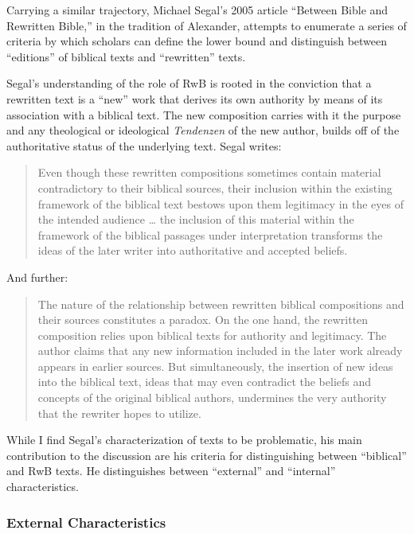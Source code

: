 Carrying a similar trajectory, Michael Segal's 2005 article ``Between Bible and Rewritten Bible,'' in the tradition of Alexander, attempts to enumerate a series of criteria by which scholars can define the lower bound and distinguish between ``editions'' of biblical texts and ``rewritten'' texts. 

Segal's understanding of the role of RwB is rooted in the conviction that a rewritten text is a ``new'' work that derives its own authority by means of its association with a biblical text. The new composition carries with it the purpose and any theological or ideological \emph{Tendenzen} of the new author, builds off of the authoritative status of the underlying text.%
    \autocite[11]{segal_henze2005} Segal writes: 

\begin{quote}
    Even though these rewritten compositions sometimes contain material contradictory to their biblical sources, their inclusion within the existing framework of the biblical text bestows upon them legitimacy in the eyes of the intended audience \ldots{} the inclusion of this material within the framework of the biblical passages under interpretation transforms the ideas of the later writer into authoritative and accepted beliefs.%
        \autocite[11]{segal_henze2005}
\end{quote} 

 And further: 

\begin{quote}
    The nature of the relationship between rewritten biblical compositions and their sources constitutes a paradox. On the one hand, the rewritten composition relies upon biblical texts for authority and legitimacy. The author claims that any new information included in the later work already appears in earlier sources. But simultaneously, the insertion of new ideas into the biblical text, ideas that may even contradict the beliefs and concepts of the original biblical authors, undermines the very authority that the rewriter hopes to utilize.%
    \autocite[11-12]{segal_henze2005}
\end{quote} 

While I find Segal's characterization of \rwb texts to be problematic,%
%
%
his main contribution to the discussion are his criteria for distinguishing between ``biblical'' and RwB texts. He distinguishes between ``external'' and ``internal'' characteristics. 

\subsubsection{External Characteristics}

